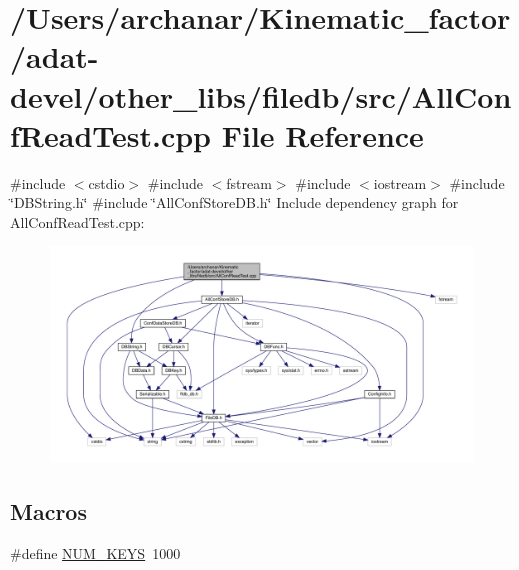 \hypertarget{adat-devel_2other__libs_2filedb_2src_2AllConfReadTest_8cpp}{}\section{/\+Users/archanar/\+Kinematic\+\_\+factor/adat-\/devel/other\+\_\+libs/filedb/src/\+All\+Conf\+Read\+Test.cpp File Reference}
\label{adat-devel_2other__libs_2filedb_2src_2AllConfReadTest_8cpp}
{\ttfamily \#include $<$cstdio$>$}\newline
{\ttfamily \#include $<$fstream$>$}\newline
{\ttfamily \#include $<$iostream$>$}\newline
{\ttfamily \#include \char`\"{}D\+B\+String.\+h\char`\"{}}\newline
{\ttfamily \#include \char`\"{}All\+Conf\+Store\+D\+B.\+h\char`\"{}}\newline
Include dependency graph for All\+Conf\+Read\+Test.\+cpp\+:
\nopagebreak
\begin{figure}[H]
\begin{center}
\leavevmode
\includegraphics[width=350pt]{d8/d0f/adat-devel_2other__libs_2filedb_2src_2AllConfReadTest_8cpp__incl}
\end{center}
\end{figure}
\subsection*{Macros}
\begin{DoxyCompactItemize}
\item 
\#define \mbox{\hyperlink{adat-devel_2other__libs_2filedb_2src_2AllConfReadTest_8cpp_a9a8c7403a867e0c9543467ee8754050d}{N\+U\+M\+\_\+\+K\+E\+YS}}~1000
\end{DoxyCompactItemize}
